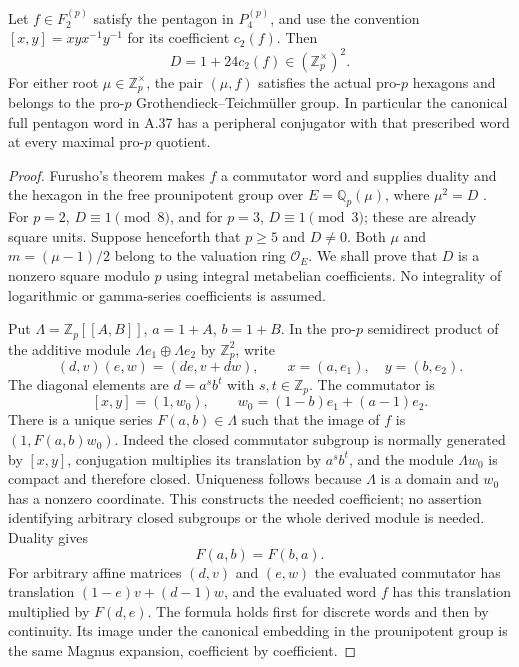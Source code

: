 Let $f\in F_2^{(p)}$ satisfy the pentagon in $P_4^{(p)}$, and use
the convention $[x,y]=xyx^{-1}y^{-1}$ for its coefficient $c_2(f)$.
Then
\[
               D=1+24c_2(f)\in(\mathbb Z_p^\times)^2.            \tag{C.33.1}
\]
For either root $\mu\in\mathbb Z_p^\times$, the pair $(\mu,f)$
satisfies the actual pro-$p$ hexagons and belongs to the pro-$p$
Grothendieck--Teichm\"uller group. In particular the canonical
full pentagon word in A.37 has a peripheral conjugator with that
prescribed word at every maximal pro-$p$ quotient.

\begin{proof}
Furusho's theorem makes $f$ a commutator word and supplies duality
and the hexagon in the free prounipotent group over
$E=\mathbb Q_p(\mu)$, where $\mu^2=D$
\cite[Theorem 2 and Corollary 12]{Furusho2010}. For $p=2$,
$D\equiv1\pmod8$, and for $p=3$, $D\equiv1\pmod3$; these are
already square units. Suppose henceforth that $p\geq5$ and
$D\ne0$. Both $\mu$ and $m=(\mu-1)/2$ belong to the valuation
ring $\mathcal O_E$. We shall prove that $D$ is a nonzero square
modulo $p$ using integral metabelian coefficients. No integrality
of logarithmic or gamma-series coefficients is assumed.

Put $\Lambda=\mathbb Z_p[[A,B]]$, $a=1+A$, $b=1+B$. In the
pro-$p$ semidirect product of the additive module
$\Lambda e_1\oplus\Lambda e_2$ by $\mathbb Z_p^2$, write
\[
 (d,v)(e,w)=(de,v+dw),\qquad
 x=(a,e_1),\quad y=(b,e_2).
\]
The diagonal elements are $d=a^s b^t$ with $s,t\in\mathbb Z_p$.
The commutator is
\[
 [x,y]=(1,w_0),\qquad
 w_0=(1-b)e_1+(a-1)e_2.
\]
There is a unique series $F(a,b)\in\Lambda$ such that the image
of $f$ is $(1,F(a,b)w_0)$. Indeed the closed commutator subgroup
is normally generated by $[x,y]$, conjugation multiplies its
translation by $a^s b^t$, and the module $\Lambda w_0$ is compact
and therefore closed. Uniqueness follows because $\Lambda$ is a
domain and $w_0$ has a nonzero coordinate. This constructs the
needed coefficient; no assertion identifying arbitrary closed
subgroups or the whole derived module is needed. Duality gives
\[
                              F(a,b)=F(b,a).                    \tag{C.33.2}
\]
For arbitrary affine matrices $(d,v)$ and $(e,w)$ the evaluated
commutator has translation $(1-e)v+(d-1)w$, and the evaluated
word $f$ has this translation multiplied by $F(d,e)$. The formula
holds first for discrete words and then by continuity. Its image
under the canonical embedding in the prounipotent group is the
same Magnus expansion, coefficient by coefficient.


\end{proof}
